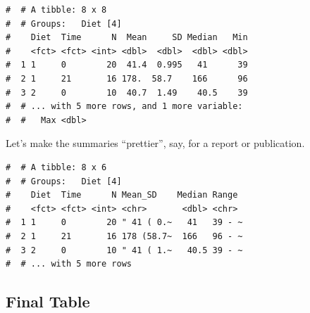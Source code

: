 \documentclass[a4paper,9pt,twocolumn,twoside,printwatermark=false]{pinp}
\begin{document}
\begin{ShadedResult}
\begin{verbatim}
#  # A tibble: 8 x 8
#  # Groups:   Diet [4]
#    Diet  Time      N  Mean     SD Median   Min
#    <fct> <fct> <int> <dbl>  <dbl>  <dbl> <dbl>
#  1 1     0        20  41.4  0.995   41      39
#  2 1     21       16 178.  58.7    166      96
#  3 2     0        10  40.7  1.49    40.5    39
#  # ... with 5 more rows, and 1 more variable:
#  #   Max <dbl>
\end{verbatim}
\end{ShadedResult}

Let's make the summaries ``prettier'', say, for a report or publication.

\begin{Shaded}
\end{Shaded}

\begin{ShadedResult}
\begin{verbatim}
#  # A tibble: 8 x 6
#  # Groups:   Diet [4]
#    Diet  Time      N Mean_SD    Median Range 
#    <fct> <fct> <int> <chr>       <dbl> <chr> 
#  1 1     0        20 " 41 ( 0.~   41   39 - ~
#  2 1     21       16 178 (58.7~  166   96 - ~
#  3 2     0        10 " 41 ( 1.~   40.5 39 - ~
#  # ... with 5 more rows
\end{verbatim}
\end{ShadedResult}

\subsection{Final Table}\label{final-table}
\end{document}
